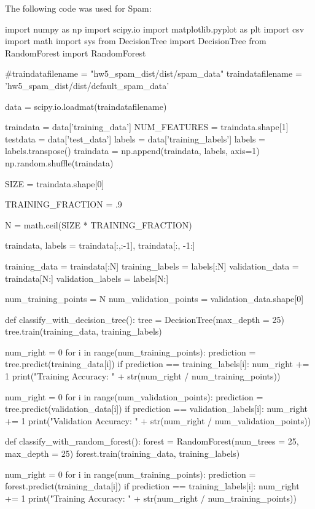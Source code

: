 \documentclass{article}
\begin{document}
The following code was used for Spam:
\begin{python}
import numpy as np
import scipy.io
import matplotlib.pyplot as plt
import csv
import math
import sys
from DecisionTree import DecisionTree
from RandomForest import RandomForest

#traindatafilename = "hw5_spam_dist/dist/spam_data"
traindatafilename = 'hw5_spam_dist/dist/default_spam_data'

data = scipy.io.loadmat(traindatafilename)

traindata = data['training_data']
NUM_FEATURES = traindata.shape[1]
testdata = data['test_data']
labels = data['training_labels']
labels = labels.transpose()
traindata = np.append(traindata, labels, axis=1)
np.random.shuffle(traindata)

SIZE = traindata.shape[0]

TRAINING_FRACTION = .9

N = math.ceil(SIZE * TRAINING_FRACTION)

traindata, labels = traindata[:,:-1], traindata[:, -1:]

training_data = traindata[:N]
training_labels = labels[:N]
validation_data = traindata[N:]
validation_labels = labels[N:]

num_training_points = N
num_validation_points = validation_data.shape[0]

def classify_with_decision_tree():
    tree = DecisionTree(max_depth = 25)
    tree.train(training_data, training_labels)

    num_right = 0
    for i in range(num_training_points):
        prediction = tree.predict(training_data[i])
        if prediction == training_labels[i]:
            num_right += 1
    print("Training Accuracy: " + str(num_right / num_training_points))

    num_right = 0
    for i in range(num_validation_points):
        prediction = tree.predict(validation_data[i])
        if prediction == validation_labels[i]:
            num_right += 1
    print("Validation Accuracy: " + str(num_right / num_validation_points))

def classify_with_random_forest():
    forest = RandomForest(num_trees = 25, max_depth = 25)
    forest.train(training_data, training_labels)

    num_right = 0
    for i in range(num_training_points):
        prediction = forest.predict(training_data[i])
        if prediction == training_labels[i]:
            num_right += 1
    print("Training Accuracy: " + str(num_right / num_training_points))


\end{python}
\end{document}
